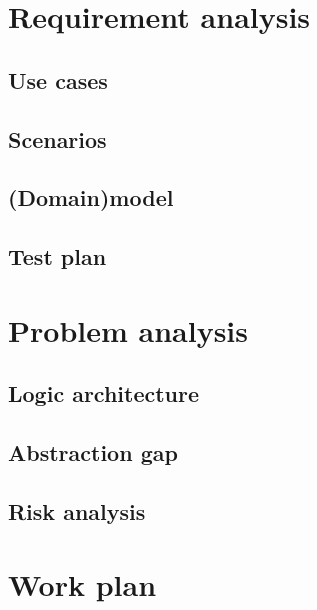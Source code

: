 \documentclass{llncs}
\newcommand{\labelsec}[1]{\label{sec:#1}}
\newcommand{\labelssec}[1]{\label{ssec:#1}}
\begin{document}
 
\section{Requirement analysis}
\labelsec{ReqAnalysis}
\subsection{Use cases}
\labelssec{UseCases}

\subsection{Scenarios}
\labelssec{Scenarios}

\subsection{(Domain)model}

\subsection{Test plan}

\section{Problem analysis}
\labelsec{ProblemAnalysis}
\subsection{Logic architecture}
\subsection{Abstraction gap}
\subsection{Risk analysis}

\section{Work plan}
\labelsec{wplan}
\end{document}

